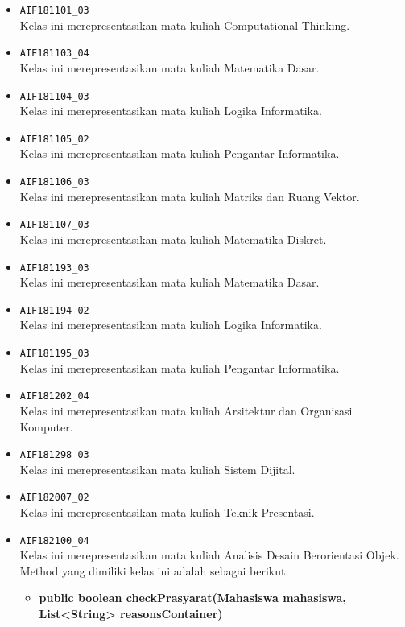 \begin{enumerate}
\begin{itemize}
\begin{itemize}
		\end{itemize}
		\item \texttt{AIF181101\_03} \\
		Kelas ini merepresentasikan mata kuliah Computational Thinking.
		\item \texttt{AIF181103\_04} \\
		Kelas ini merepresentasikan mata kuliah Matematika Dasar.
		\item \texttt{AIF181104\_03} \\
		Kelas ini merepresentasikan mata kuliah Logika Informatika.
		\item \texttt{AIF181105\_02} \\
		Kelas ini merepresentasikan mata kuliah Pengantar Informatika.
		\item \texttt{AIF181106\_03} \\
		Kelas ini merepresentasikan mata kuliah Matriks dan Ruang Vektor.
		\item \texttt{AIF181107\_03} \\
		Kelas ini merepresentasikan mata kuliah Matematika Diskret.
		\item \texttt{AIF181193\_03} \\
		Kelas ini merepresentasikan mata kuliah Matematika Dasar.
		\item \texttt{AIF181194\_02} \\
		Kelas ini merepresentasikan mata kuliah Logika Informatika.
		\item \texttt{AIF181195\_03} \\
		Kelas ini merepresentasikan mata kuliah Pengantar Informatika.
		\item \texttt{AIF181202\_04} \\
		Kelas ini merepresentasikan mata kuliah Arsitektur dan Organisasi Komputer.
		\item \texttt{AIF181298\_03} \\
		Kelas ini merepresentasikan mata kuliah Sistem Dijital.
		\item \texttt{AIF182007\_02} \\
		Kelas ini merepresentasikan mata kuliah Teknik Presentasi.
		\item \texttt{AIF182100\_04} \\
		Kelas ini merepresentasikan mata kuliah Analisis Desain Berorientasi Objek. Method yang dimiliki kelas ini adalah sebagai berikut: 
		\begin{itemize}
			\item \textbf{public boolean checkPrasyarat(Mahasiswa mahasiswa, List<String> reasonsContainer)}\\

\end{itemize}
\end{itemize}
\end{enumerate}
